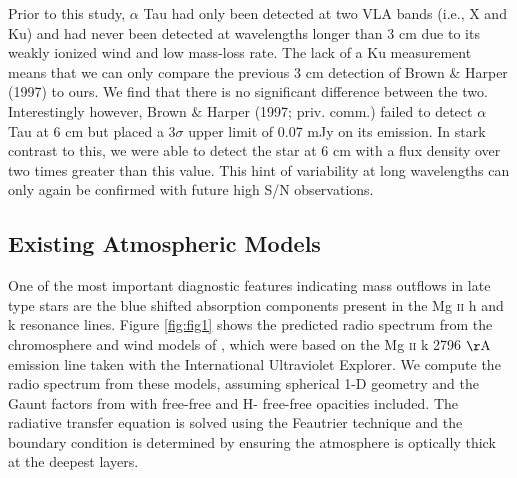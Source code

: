 \documentclass[iop]{emulateapj}
\begin{document}
Prior to this study, $\alpha$ Tau had only been detected at two VLA bands (i.e., X and Ku) and had never been detected at wavelengths longer than 3 cm due to its weakly ionized wind and low mass-loss rate. The lack of a Ku measurement means that we can only compare the previous 3 cm detection of Brown $\&$ Harper (1997) to ours. We find that there is no significant difference between the two. Interestingly however, Brown $\&$ Harper (1997; priv. comm.) failed to detect $\alpha$ Tau at 6 cm but placed a 3$\sigma$ upper limit of 0.07 mJy on its emission. In stark contrast to this, we were able to detect the star at 6 cm with a flux density over two times greater than this value. This hint of variability at long wavelengths can only again be confirmed with future high S/N observations.


\subsection{Existing Atmospheric Models} \label{disc2}
One of the most important diagnostic features indicating mass outflows in late type stars are the blue shifted absorption components present in the Mg {\textsc{ii}} h and k resonance lines. Figure \ref{fig:fig1} shows the predicted radio spectrum from the chromosphere and wind models of \cite{1985pssl.proc..351D}, which were based on the Mg {\textsc{ii}} k 2796 $\rm{\AA}$ emission line taken with the International Ultraviolet Explorer. We compute the radio spectrum from these models, assuming spherical 1-D geometry and the Gaunt factors from \cite{1988ApJ...327..477H} with free-free and H- free-free opacities included. The radiative transfer equation is solved using the Feautrier technique \cite[see, e.g.,][]{1994MNRAS.268..894H} and the boundary condition is determined by ensuring the atmosphere is optically thick at the deepest layers.
\end{document}
